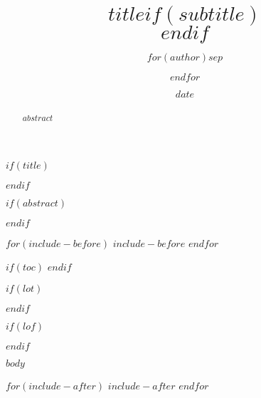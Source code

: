 \documentclass[11pt,a4paper]{article}
\title{$title$$if(subtitle)$\\\vspace{0.5em}{\large $subtitle$}$endif$}
\author{$for(author)$\FZLiuKai{$author$}$sep$ \and $endfor$}
\date{$date$}
\begin{document}
$if(title)$
  \maketitle
$endif$

$if(abstract)$
  \begin{abstract}
    $abstract$
  \end{abstract}
$endif$

$for(include-before)$
  $include-before$
$endfor$

$if(toc)$
{
  \hypersetup{linkcolor=black}
  \setcounter{tocdepth}{$toc-depth$}
  \tableofcontents
}
$endif$

$if(lot)$
  \listoftables
$endif$

$if(lof)$
  \listoffigures
$endif$

$body$

$for(include-after)$
  $include-after$
$endfor$
\end{document}
